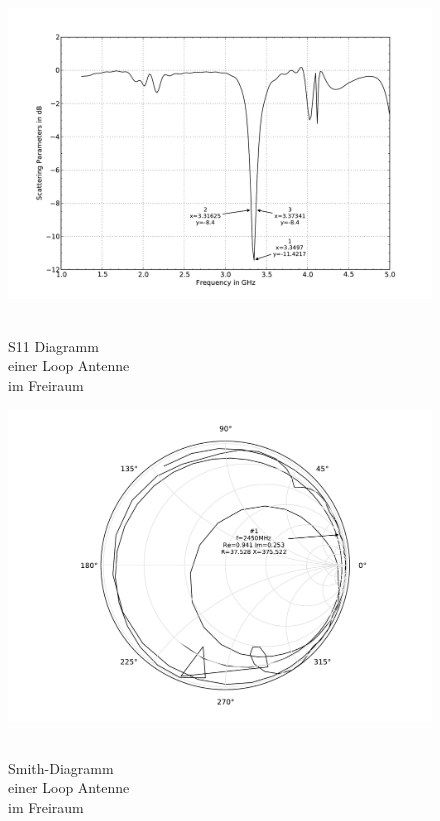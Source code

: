 \begin{figure}[!ht]
\begin{center}
  \includegraphics[width=\linewidth]{content/bilder/Evaluation/Loop/ohneABS/S11_Loop_Coil_ohneABS.pdf}
  \caption{\\S11 Diagramm \\einer Loop Antenne \\ im Freiraum}\label{fig:S11_Loop_freiraum_1}
\endminipage%
{}
  \includegraphics[width=\linewidth]{content/bilder/Evaluation/Loop/ohneABS/Smith_Loop_Coil_ohneABS.pdf}
  \caption{\\Smith-Diagramm \\einer Loop Antenne \\ im Freiraum}\label{fig:Smith_Loop_freiraum_2}
\endminipage
\end{center}
\end{figure}


